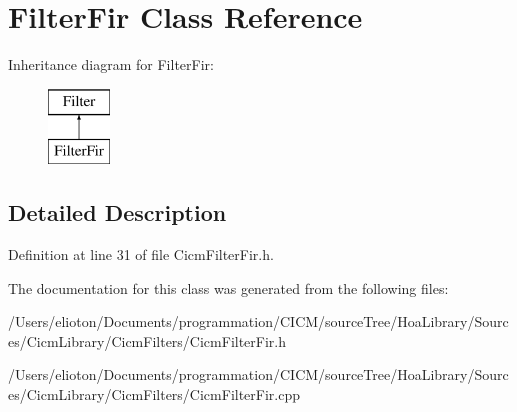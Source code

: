\hypertarget{class_filter_fir}{\section{Filter\-Fir Class Reference}
\label{class_filter_fir}
}
Inheritance diagram for Filter\-Fir\-:\begin{figure}[H]
\begin{center}
\leavevmode
\includegraphics[height=2.000000cm]{class_filter_fir}
\end{center}
\end{figure}


\subsection{Detailed Description}


Definition at line 31 of file Cicm\-Filter\-Fir.\-h.



The documentation for this class was generated from the following files\-:\begin{DoxyCompactItemize}
\item 
/\-Users/elioton/\-Documents/programmation/\-C\-I\-C\-M/source\-Tree/\-Hoa\-Library/\-Sources/\-Cicm\-Library/\-Cicm\-Filters/Cicm\-Filter\-Fir.\-h\item 
/\-Users/elioton/\-Documents/programmation/\-C\-I\-C\-M/source\-Tree/\-Hoa\-Library/\-Sources/\-Cicm\-Library/\-Cicm\-Filters/Cicm\-Filter\-Fir.\-cpp\end{DoxyCompactItemize}
